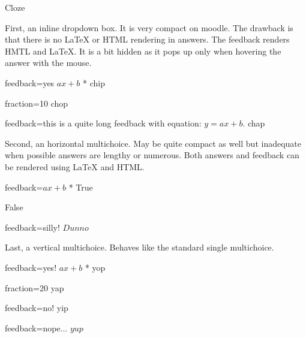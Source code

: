 \documentclass[twocolumn]{article}
\begin{document}
\begin{quiz}
\begin{cloze}{Cloze}
\begin{multi}
First, an inline dropdown box. It is very compact on moodle. The drawback is 
that there is no LaTeX or HTML rendering in answers. The feedback renders HMTL 
and LaTeX. It is a bit hidden as it pops up only when hovering the 
answer with the mouse.
\item[feedback={yes $ax+b$}]* chip
\item[fraction=10] chop
\item[feedback={this is a quite long feedback with equation: $y=ax+b$.}] 
chap
\end{multi}

\begin{multi}[horizontal]
Second, an horizontal multichoice. May be quite compact as well but inadequate 
when possible answers are lengthy or numerous. Both answers and feedback can 
be rendered using LaTeX and HTML.
\item[feedback={$ax+b$}]* True
\item[] False
\item[feedback={silly!}] $Dunno$
\end{multi}

\begin{multi}[vertical]
Last, a vertical multichoice. Behaves like the standard single multichoice.
\item[feedback={yes! $ax+b$}]* yop
\item[fraction=20] yap
\item[feedback={no!}] yip
\item[feedback={nope...}] $yup$
\end{multi}
\end{cloze}

\end{quiz}

\end{document}
